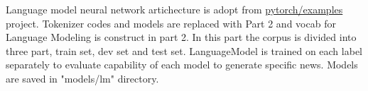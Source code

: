 \label{chapter:experiments}
 
Language model neural network artichecture is adopt from \href{https://github.com/pytorch/examples/tree/master/word_language_model}{pytorch/examples} project. Tokenizer codes and models are replaced with Part 2 and vocab for Language Modeling is construct in part 2. In this part the corpus is divided into three part, train set, dev set and test set. LanguageModel is trained on each label separately to evaluate capability of each model to generate specific news. Models are saved in "models/lm" directory. 